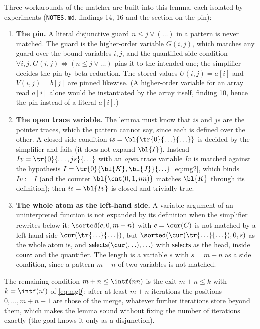 Three workarounds of the matcher are built into this lemma, each isolated by experiments
(\texttt{NOTES.md}, findings 14, 16 and the section on the pin):
\begin{enumerate}[nosep]
\item \textbf{The pin.} A literal disjunctive guard $n \le j \vee (\ldots)$ in a pattern is never
  matched. The guard is the higher-order variable $G(i, j)$, which matches any guard over the bound
  variables $i, j$, and the quantified side condition
  $\forall i, j.\ G(i, j) \Leftrightarrow (n \le j \vee \ldots)$ pins it to the intended one; the simplifier
  decides the pin by beta reduction. The stored values $U(i, j) = a[i]$ and $V(i, j) = b[j]$ are pinned
  likewise. (A higher-order variable for an array read $a[i]$ alone would be instantiated by the array
  itself, finding 10, hence the pin instead of a literal $a[i]$.)
\item \textbf{The open trace variable.} The lemma must know that $is$ and $js$ are the pointer traces,
  which the pattern cannot say, since each is defined over the other. A closed side condition
  $is = \bl{\tr{0}{\ldots}{\ldots}}$ is decided by the simplifier and fails (it does not expand $\bl{I}$).
  Instead $Iv = \tr{0}{\ldots, js}{\ldots}$ with an \emph{open} trace variable $Iv$ is matched against
  the hypothesis $I = \tr{0}{\bl{K}, \bl{J}}{\ldots}$ \eqref{eq:mg2}, which binds $Iv := I$ (and the
  counter $\bl{\cnt(0, 1, nn)}$ matches $\bl{K}$ through its definition); then $is = \bl{Iv}$ is closed
  and trivially true.
\item \textbf{The whole atom as the left-hand side.} A variable argument of an uninterpreted function
  is not expanded by its definition when the simplifier rewrites below it: $\sorted(c, 0, m + n)$ with
  $c = \cur(C)$ is not matched by a left-hand side $\cur(\tr{\ldots}{\ldots})$, but
  $\sorted(\cur(\tr{\ldots}{\ldots}), 0, s)$ as the whole atom is, and $\mathsf{selects}(\cur(\ldots), \ldots)$
  with $\mathsf{selects}$ as the head, inside $\mathsf{count}$ and the quantifier. The length is a
  variable $s$ with $s = m + n$ as a side condition, since a pattern $m + n$ of two variables is not matched.
\end{enumerate}
The remaining condition $m + n \le \intf(nn)$ is the exit $m + n \le k$ with $k = \intf(n')$ of
\eqref{eq:mg0}: after at least $m + n$ iterations the positions $0, \ldots, m + n - 1$ are those of the
merge, whatever further iterations store beyond them, which makes the lemma sound without fixing the
number of iterations exactly (the goal knows it only as a disjunction).


